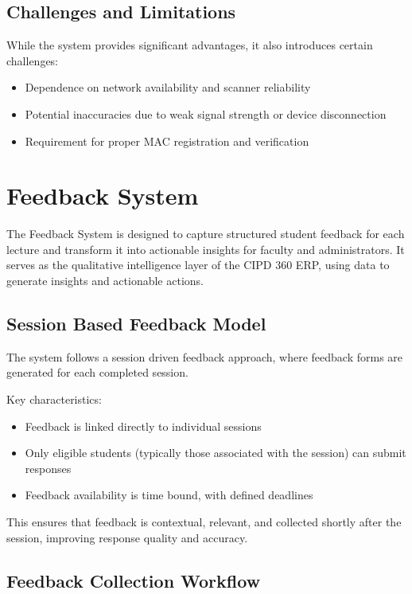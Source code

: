 \subsection{Challenges and Limitations}

While the system provides significant advantages, it also introduces certain challenges:

\begin{itemize}
    \item Dependence on network availability and scanner reliability
    \item Potential inaccuracies due to weak signal strength or device disconnection
    \item Requirement for proper MAC registration and verification
\end{itemize}

\section{Feedback System}

The Feedback System is designed to capture structured student feedback for each lecture and
transform it into actionable insights for faculty and administrators. It serves as the qualitative
intelligence layer of the CIPD 360 ERP, using data to generate insights and actionable actions.

\subsection{Session Based Feedback Model}

The system follows a session driven feedback approach, where feedback forms are generated for
each completed session.

Key characteristics:

\begin{itemize}
    \item Feedback is linked directly to individual sessions
    \item Only eligible students (typically those associated with the session) can submit responses
    \item Feedback availability is time bound, with defined deadlines
\end{itemize}

This ensures that feedback is contextual, relevant, and collected shortly after the session, improving
response quality and accuracy.

\subsection{Feedback Collection Workflow}

